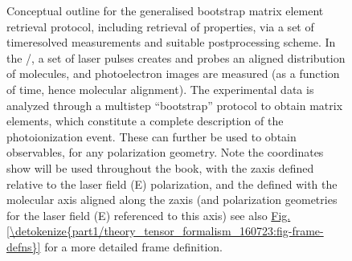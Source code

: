 \documentclass[letterpaper,table,10pt,english]{jupyterBook}
\begin{document}
\begin{figure}[htbp]
\centering
\capstart

\noindent{}
\caption{Conceptual outline for the generalised bootstrap matrix element retrieval protocol, including retrieval of {\hyperref[\detokenize{backmatter/glossary:term-MF}]{}} properties, via a set of time\sphinxhyphen{}resolved measurements and suitable post\sphinxhyphen{}processing scheme. In the {\hyperref[\detokenize{backmatter/glossary:term-LF}]{}}/{\hyperref[\detokenize{backmatter/glossary:term-AF}]{}}, a set of laser pulses creates and probes an aligned distribution of molecules, and photoelectron images are measured (as a function of time, hence molecular alignment). The experimental data is analyzed through a multi\sphinxhyphen{}step “bootstrap” protocol to obtain matrix elements, which constitute a complete description of the photoionization event. These can further be used to obtain {\hyperref[\detokenize{backmatter/glossary:term-MF}]{}} observables, for any polarization geometry. Note the coordinates show will be used throughout the book, with the {\hyperref[\detokenize{backmatter/glossary:term-LF}]{}} z\sphinxhyphen{}axis defined relative to the laser field (E) polarization, and the {\hyperref[\detokenize{backmatter/glossary:term-MF}]{}} defined with the molecular axis aligned along the z\sphinxhyphen{}axis (and polarization geometries for the laser field (E) referenced to this axis) \sphinxhyphen{} see also \hyperref[\detokenize{part1/theory_tensor_formalism_160723:fig-frame-defns}]{Fig.\@ \ref{\detokenize{part1/theory_tensor_formalism_160723:fig-frame-defns}}} for a more detailed frame definition.}\label{\detokenize{part1/main_intro_060723:fig-bootstrap-concept-outline}}\end{figure}
\end{document}
